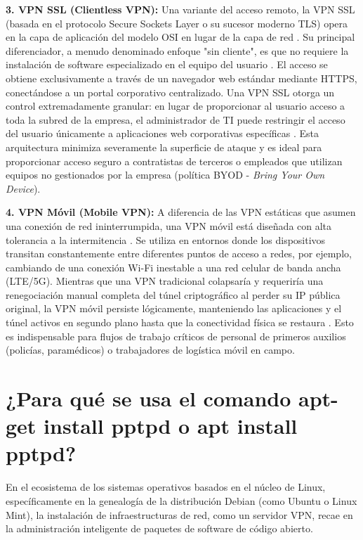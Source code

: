 \documentclass[a4paper,12pt]{article}
\begin{document}
\textbf{3. VPN SSL (Clientless VPN):}
Una variante del acceso remoto, la VPN SSL (basada en el protocolo Secure Sockets Layer o su sucesor moderno TLS) opera en la capa de aplicación del modelo OSI en lugar de la capa de red \cite{checkpoint_ssl, paloalto_ipsec_vs_ssl}. Su principal diferenciador, a menudo denominado enfoque "sin cliente", es que no requiere la instalación de software especializado en el equipo del usuario \cite{aws_vpn}. El acceso se obtiene exclusivamente a través de un navegador web estándar mediante HTTPS, conectándose a un portal corporativo centralizado. Una VPN SSL otorga un control extremadamente granular: en lugar de proporcionar al usuario acceso a toda la subred de la empresa, el administrador de TI puede restringir el acceso del usuario únicamente a aplicaciones web corporativas específicas \cite{paloalto_ipsec_vs_ssl}. Esta arquitectura minimiza severamente la superficie de ataque y es ideal para proporcionar acceso seguro a contratistas de terceros o empleados que utilizan equipos no gestionados por la empresa (política BYOD - \textit{Bring Your Own Device}).

\textbf{4. VPN Móvil (Mobile VPN):}
A diferencia de las VPN estáticas que asumen una conexión de red ininterrumpida, una VPN móvil está diseñada con alta tolerancia a la intermitencia \cite{cisco_mobile_vpn}. Se utiliza en entornos donde los dispositivos transitan constantemente entre diferentes puntos de acceso a redes, por ejemplo, cambiando de una conexión Wi-Fi inestable a una red celular de banda ancha (LTE/5G). Mientras que una VPN tradicional colapsaría y requeriría una renegociación manual completa del túnel criptográfico al perder su IP pública original, la VPN móvil persiste lógicamente, manteniendo las aplicaciones y el túnel activos en segundo plano hasta que la conectividad física se restaura \cite{cisco_mobile_vpn}. Esto es indispensable para flujos de trabajo críticos de personal de primeros auxilios (policías, paramédicos) o trabajadores de logística móvil en campo.


\newpage
\section{¿Para qué se usa el comando apt-get install pptpd o apt install pptpd?}

En el ecosistema de los sistemas operativos basados en el núcleo de Linux, específicamente en la genealogía de la distribución Debian (como Ubuntu o Linux Mint), la instalación de infraestructuras de red, como un servidor VPN, recae en la administración inteligente de paquetes de software de código abierto.
\end{document}
